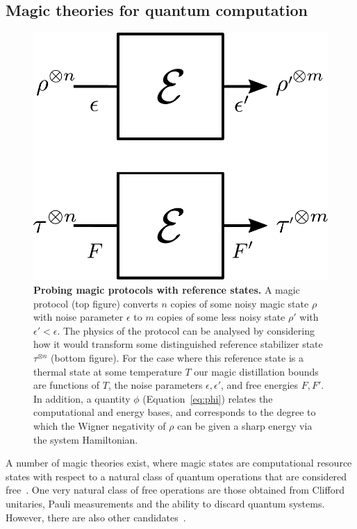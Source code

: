 \documentclass[pra,
aps,
twocolumn,
superscriptaddress,
groupedaddress,
nofootinbib,
reprint
]{revtex4-1}
\begin{document}
\subsection{Magic theories for quantum computation}
\label{sec:mono}
\begin{figure}[t]
    \centering
        \includegraphics[scale=0.3]{figs/protocol_diagram.pdf}
    \caption{\textbf{Probing magic protocols with reference states.} 
	A magic protocol (top figure) converts $n$ copies of some noisy magic state $\rho$ with noise parameter $\epsilon$ to $m$ copies of some less noisy state $\rho'$ with $\epsilon' < \epsilon$. The physics of the protocol can be analysed by considering how it would transform some distinguished reference stabilizer state $\tau^{\otimes n}$ (bottom figure). For the case where this reference state is a thermal state at some temperature $T$ our magic distillation bounds are functions of $T$, the noise parameters $\epsilon, \epsilon'$, and free energies $F, F'$. In addition, a quantity $\phi$ (Equation~\ref{eq:phi}) relates the computational and energy bases, and corresponds to the degree to which the Wigner negativity of $\rho$ can be given a sharp energy via the system Hamiltonian.}
    \label{fig:sketch}
\end{figure}
A number of magic theories exist, where magic states are computational resource states with respect to a natural class of quantum operations that are considered free~\cite{Gour_2019}. One very natural class of free operations are those obtained from Clifford unitaries, Pauli measurements and the ability to discard quantum systems. However, there are also other candidates~\cite{cit:ahmadi, cit:seddon, Wang_2019}.
\end{document}
